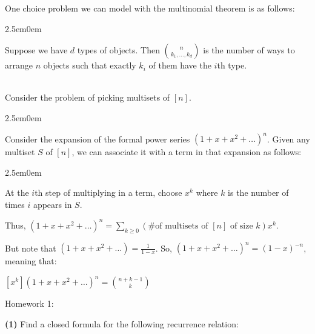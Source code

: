 \documentclass{book}
\newcommand{\hOne}{%
   \color{Black}%
   \fontsize{14}{16}\selectfont%
}
\newcommand{\hTwo}{%
\color{MidnightBlue}%
   \fontsize{13}{15}\selectfont%
}
\newcommand{\hThree}{%
   \color{PineGreen!85!Orange}
   \fontsize{12}{14}\selectfont%
}
\newenvironment{myIndent}{%
   \begin{adjustwidth}{2.5em}{0em}%
}{%
   \end{adjustwidth}%
}
\newcommand{\blab}[1]{\textbf{#1}}
\newcommand{\mySepTwo}[1][.]{%
   {\noindent\color{#1}{\rule{6.5in}{0.5mm}}}\\%
}
\newcommand{\retTwo}{\hfill\bigbreak}
\newcommand{\mHeader}[1]{{
   \color{Black}%
   \fontsize{20}{18}\selectfont%
   #1\retTwo
}}
\begin{document}
One choice problem we can model with the multinomial theorem is as follows:

\begin{myIndent}\hTwo
   Suppose we have $d$ types of objects. Then $\binom{n}{k_1, \ldots, k_d}$ is the number of ways to arrange $n$ objects such that exactly $k_i$ of them have the $i$th type.\retTwo
\end{myIndent}

\mySepTwo

Consider the problem of picking multisets of $[n]$.
\begin{myIndent}\hTwo
   Consider the expansion of the formal power series $(1 + x + x^2 + \ldots)^n$. Given any multiset $S$ of $[n]$, we can associate it with a term in that expansion as follows:
   \begin{myIndent}\hThree
      At the $i$th step of multiplying in a term, choose $x^k$ where $k$ is the number of times $i$ appears in $S$.\retTwo
   \end{myIndent}

   Thus, $(1 + x + x^2 + \ldots)^n = \sum\limits_{k\geq0}(\text{\# of multisets of }[n]\text{ of size }k)x^k$.\retTwo

   But note that $(1 + x + x^2 + \ldots) = \frac{1}{1-x}$. So, $(1 + x + x^2 + \ldots)^n = (1 - x)^{-n}$,\\ meaning that:

   {\centering $[x^k](1 + x + x^2 + \ldots)^n = \binom{n + k - 1}{k}$\retTwo\par}
\end{myIndent}



































\newpage
\phantom{a}
\newpage

\hOne
\mHeader{Homework 1:}

\blab{(1)} Find a closed formula for the following recurrence relation:
\end{document}
